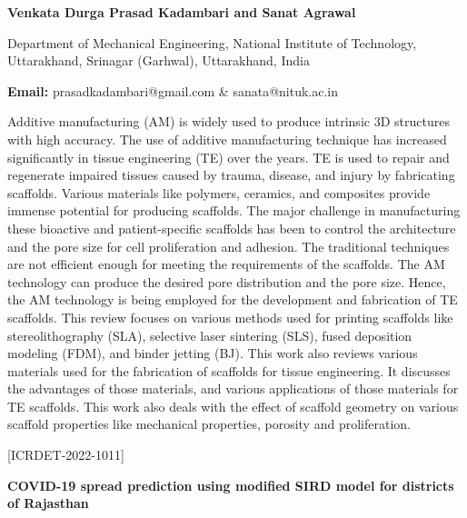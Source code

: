 \documentclass[twoside,11pt]{amsart}
\begin{document}
\centerline{\textbf{ Venkata Durga Prasad Kadambari and Sanat Agrawal}}
\vskip 2mm
\begin{flushleft}
Department of Mechanical Engineering,			
National Institute of Technology, Uttarakhand, 	
Srinagar (Garhwal), Uttarakhand, India

\vskip 2mm
\end{flushleft}
\vskip 2mm
\begin{flushleft}
{\bf Email:} prasadkadambari@gmail.com 	 \& sanata@nituk.ac.in
\end{flushleft}
\vskip 5mm
Additive manufacturing (AM) is widely used to produce intrinsic 3D structures with high accuracy. The use of additive manufacturing technique has increased significantly in tissue engineering (TE) over the years. TE is used to repair and regenerate impaired tissues caused by trauma, disease, and injury by fabricating scaffolds. Various materials like polymers, ceramics, and composites provide immense potential for producing scaffolds. The major challenge in manufacturing these bioactive and patient-specific scaffolds has been to control the architecture and the pore size for cell proliferation and adhesion. The traditional techniques are not efficient enough for meeting the requirements of the scaffolds. The AM technology can produce the desired pore distribution and the pore size. Hence, the AM technology is being employed for the development and fabrication of TE scaffolds. This review focuses on various methods used for printing scaffolds like stereolithography (SLA), selective laser sintering (SLS), fused deposition modeling (FDM), and binder jetting (BJ). This work also reviews various materials used for the fabrication of scaffolds for tissue engineering. It discusses the advantages of those materials, and various applications of those materials for TE scaffolds. This work also deals with the effect of scaffold geometry on various scaffold properties like mechanical properties, porosity and proliferation.
\vskip 5mm
\newpage
\vskip 10mm
\begin{flushleft}
\centerline{[ICRDET-2022-1011]}
\end{flushleft}
\begin{center}\bf\LARGE
COVID-19 spread prediction using modified SIRD model for districts of Rajasthan
\end{center}
\vskip 5mm
\end{document}
